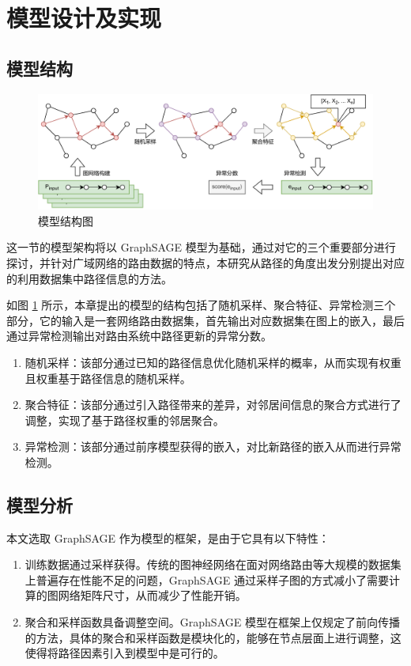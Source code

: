 \section{模型设计及实现}

\subsection{模型结构}

\begin{figure}[h]
    \includegraphics[width=\linewidth]{chapter/c4_images/c4_model.pdf}
    \caption{模型结构图}
    \label{c4_model}
\end{figure}

这一节的模型架构将以 GraphSAGE 模型为基础，通过对它的三个重要部分进行探讨，并针对广域网络的路由数据的特点，本研究从路径的角度出发分别提出对应的利用数据集中路径信息的方法。

如图 \ref{c4_model} 所示，本章提出的模型的结构包括了随机采样、聚合特征、异常检测三个部分，它的输入是一套网络路由数据集，首先输出对应数据集在图上的嵌入，最后通过异常检测输出对路由系统中路径更新的异常分数。

\begin{enumerate}
    \item 随机采样：该部分通过已知的路径信息优化随机采样的概率，从而实现有权重且权重基于路径信息的随机采样。
    \item 聚合特征：该部分通过引入路径带来的差异，对邻居间信息的聚合方式进行了调整，实现了基于路径权重的邻居聚合。
    \item 异常检测：该部分通过前序模型获得的嵌入，对比新路径的嵌入从而进行异常检测。
\end{enumerate}

\subsection{模型分析}

本文选取 GraphSAGE 作为模型的框架，是由于它具有以下特性：

\begin{enumerate}
    \item 训练数据通过采样获得。传统的图神经网络在面对网络路由等大规模的数据集上普遍存在性能不足的问题，GraphSAGE 通过采样子图的方式减小了需要计算的图网络矩阵尺寸，从而减少了性能开销。
    \item 聚合和采样函数具备调整空间。GraphSAGE 模型在框架上仅规定了前向传播的方法，具体的聚合和采样函数是模块化的，能够在节点层面上进行调整，这使得将路径因素引入到模型中是可行的。
\end{enumerate}

